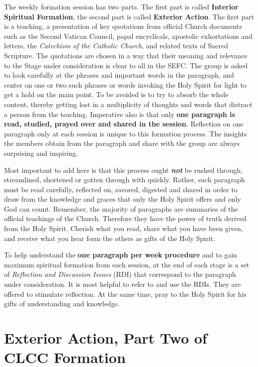 \documentclass{article}
\begin{document}
The weekly formation session has two parts. The first part is called
\textbf{Interior Spiritual Formation}, the second part is called
\textbf{Exterior Action}. The first part is a teaching, a presentation of key
quotations from official Church documents such as the Second Vatican Council,
papal encyclicals, apostolic exhortations and letters, the \emph{Catechism of
the Catholic Church}, and related texts of Sacred Scripture. The quotations are
chosen in a way that their meaning and relevance to the Stage under
consideration is clear to all in the SEFC. The group is asked to look carefully
at the phrases and important words in the paragraph, and center on one or two
such phrases or words invoking the Holy Spirit for light to get a hold on the
main point. To be avoided is to try to absorb the whole content, thereby getting
lost in a multiplicity of thoughts and words that distract a person from the
teaching. Imperative also is that only \textbf{one paragraph is read, studied,
prayed over and shared in the session}. Reflection on one paragraph only at each
session is unique to this formation process. The insights the members obtain
from the paragraph and share with the group are always surprising and inspiring.

Most important to add here is that this process ought \textbf{\emph{not}} be
rushed through, streamlined, shortened or gotten through with quickly. Rather,
each paragraph must be read carefully, reflected on, savored, digested and
shared in order to draw from the knowledge and graces that only the Holy Spirit
offers and only God can count. Remember, the majority of paragraphs are
summaries of the official teachings of the Church. Therefore they have the power
of truth derived from the Holy Spirit. Cherish what you read, share what you
have been given, and receive what you hear form the others as gifts of the Holy
Spirit.

To help understand the \textbf{one paragraph per week procedure} and to gain
maximum spiritual formation from each session, at the end of each stage is a set
of \emph{Reflection and Discussion Issues} (RDI) that correspond to the
paragraph under consideration. It is most helpful to refer to and use the
RDIs. They are offered to stimulate reflection. At the same time, pray to the
Holy Spirit for his gifts of understanding and knowledge.


\section{Exterior Action, Part Two of CLCC Formation}
\end{document}
